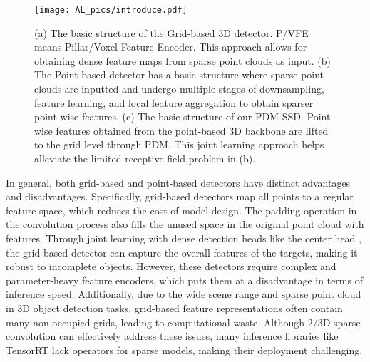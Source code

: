 \begin{figure}[t]
	\begin{center}
		\texttt{[image: AL\_pics/introduce.pdf]}
	\end{center}
	\vspace{-0.3cm}
	\caption{(a) The basic structure of the Grid-based 3D detector. P/VFE means Pillar/Voxel Feature Encoder. This approach allows for obtaining dense feature maps from sparse point clouds as input. (b) The Point-based detector has a basic structure where sparse point clouds are inputted and undergo multiple stages of downsampling, feature learning, and local feature aggregation to obtain sparser point-wise features. (c) The basic structure of our PDM-SSD. Point-wise features obtained from the point-based 3D backbone are lifted to the grid level through PDM. This joint learning approach helps alleviate the limited receptive field problem in (b).}
	\label{fig1}
	\vspace{-0.3cm}
\end{figure}

In general, both grid-based and point-based detectors have distinct advantages and disadvantages. Specifically, grid-based detectors map all points to a regular feature space, which reduces the cost of model design. The padding operation in the convolution process also fills the unused space in the original point cloud with features. Through joint learning with dense detection heads like the center head \cite{yin2021center}, the grid-based detector can capture the overall features of the targets, making it robust to incomplete objects. However, these detectors require complex and parameter-heavy feature encoders, which puts them at a disadvantage in terms of inference speed. Additionally, due to the wide scene range and sparse point cloud in 3D object detection tasks, grid-based feature representations often contain many non-occupied grids, leading to computational waste. Although 2/3D sparse convolution can effectively address these issues, many inference libraries like TensorRT lack operators for sparse models, making their deployment challenging.


